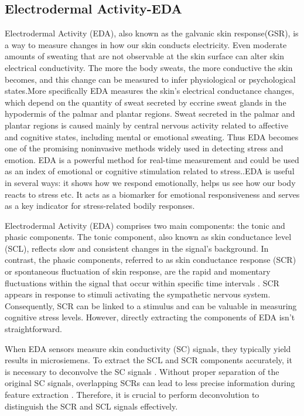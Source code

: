 \subsection{Electrodermal Activity-EDA}
\label{subsec:EDAtheory}

Electrodermal Activity (EDA), also known as the galvanic skin response(GSR), is a way to measure changes in how our skin conducts electricity. Even moderate amounts of sweating that are not observable at the skin surface can alter skin electrical conductivity. The more the body sweats, the more conductive the skin becomes, and this change can be measured to infer physiological or psychological states.More specifically  EDA measures the skin's electrical conductance changes, which depend on the quantity of sweat secreted by eccrine sweat glands in the hypodermis of the palmar and plantar regions. Sweat secreted in the palmar and plantar regions is caused mainly by central nervous activity related to affective and cognitive states, including mental or emotional sweating. Thus EDA becomes one of the promising noninvasive methods widely used in detecting stress and emotion. EDA is a powerful method for real-time measurement and could be used as an index of emotional or cognitive stimulation related to stress.\parencite{gellman2020behavioral}.EDA is useful in several ways: it shows how we respond emotionally, helps us see how our body reacts to stress etc. It acts as a biomarker for emotional responsiveness and serves as a key indicator for stress-related bodily responses. 

Electrodermal Activity (EDA) comprises two main components: the tonic and phasic components. The tonic component, also known as skin conductance level (SCL), reflects slow and consistent changes in the signal's background. In contrast, the phasic components, referred to as skin conductance response (SCR) or spontaneous fluctuation of skin response, are the rapid and momentary fluctuations within the signal that occur within specific time intervals \parencite*{hernando2017feature}. SCR appears in response to stimuli activating the sympathetic nervous system. Consequently, SCR can be linked to a stimulus and can be valuable in measuring cognitive stress levels. However, directly extracting the components of EDA isn't straightforward.

When EDA sensors measure skin conductivity (SC) signals, they typically yield results in microsiemens. To extract the SCL and SCR components accurately, it is necessary to deconvolve the SC signals \parencite[postnote]{alexander2005separating}. Without proper separation of the original SC signals, overlapping SCRs can lead to less precise information during feature extraction . Therefore, it is crucial to perform deconvolution to distinguish the SCR and SCL signals effectively.

